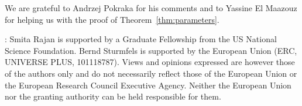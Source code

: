 \documentclass[english]{ourlematema}
\numberwithin{theorem}{section}
\theoremstyle{definition}
\begin{document}
\bigskip
\medskip

We are grateful to Andrzej Pokraka for his comments and to
 Yassine El Maazouz for helping us
with the proof of Theorem~\ref{thm:parameters}.

\bigskip \bigskip

\begin{footnotesize}
:
Smita Rajan is supported by a Graduate Fellowship from the US National Science Foundation.
Bernd Sturmfels is supported by the European Union (ERC, UNIVERSE PLUS, 101118787).
Views and opinions expressed are however those of the authors only and do not
necessarily reflect those of the European Union or the European Research Council
Executive Agency. Neither the European Union nor the granting authority can
be held responsible for them.
\end{footnotesize}
\end{document}
